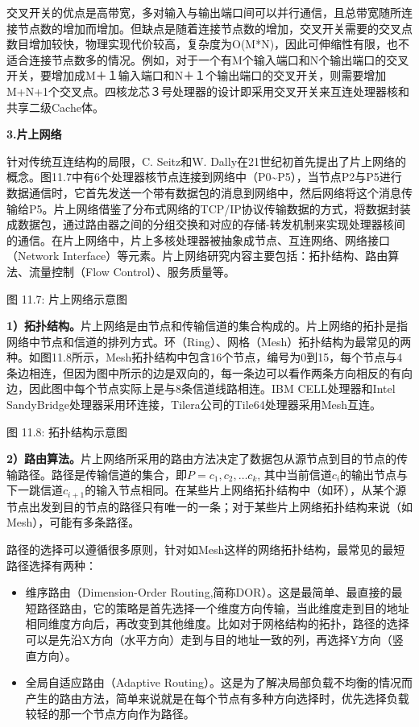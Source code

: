 \documentclass[]{ctexbook}
\begin{document}
交叉开关的优点是高带宽，多对输入与输出端口间可以并行通信，且总带宽随所连接节点数的增加而增加。但缺点是随着连接节点数的增加，交叉开关需要的交叉点数目增加较快，物理实现代价较高，复杂度为O(M*N)，因此可伸缩性有限，也不适合连接节点数多的情况。例如，对于一个有M个输入端口和N个输出端口的交叉开关，要增加成M＋１输入端口和N＋１个输出端口的交叉开关，则需要增加M+N+1个交叉点。四核龙芯３号处理器的设计即采用交叉开关来互连处理器核和共享二级Cache体。

\textbf{3.片上网络}

针对传统互连结构的局限，C. Seitz和W. Dally在21世纪初首先提出了片上网络的概念。图11.7中有6个处理器核节点连接到网络中（P0\textasciitilde P5），当节点P2与P5进行数据通信时，它首先发送一个带有数据包的消息到网络中，然后网络将这个消息传输给P5。片上网络借鉴了分布式网络的TCP/IP协议传输数据的方式，将数据封装成数据包，通过路由器之间的分组交换和对应的存储-转发机制来实现处理器核间的通信。在片上网络中，片上多核处理器被抽象成节点、互连网络、网络接口（Network Interface）等元素。片上网络研究内容主要包括：拓扑结构、路由算法、流量控制（Flow Control）、服务质量等。

图 11.7: 片上网络示意图

\textbf{1）拓扑结构。}片上网络是由节点和传输信道的集合构成的。片上网络的拓扑是指网络中节点和信道的排列方式。环（Ring）、网格（Mesh）拓扑结构为最常见的两种。如图11.8所示，Mesh拓扑结构中包含16个节点，编号为0到15，每个节点与4条边相连，但因为图中所示的边是双向的，每一条边可以看作两条方向相反的有向边，因此图中每个节点实际上是与8条信道线路相连。IBM CELL处理器和Intel SandyBridge处理器采用环连接，Tilera公司的Tile64处理器采用Mesh互连。

图 11.8: 拓扑结构示意图

\textbf{2）路由算法。}片上网络所采用的路由方法决定了数据包从源节点到目的节点的传输路径。路径是传输信道的集合，即\(P = {c_1,c_2,…c_k}\), 其中当前信道\(c_i\)的输出节点与下一跳信道\(c_{i+1}\)的输入节点相同。在某些片上网络拓扑结构中（如环），从某个源节点出发到目的节点的路径只有唯一的一条；对于某些片上网络拓扑结构来说（如Mesh），可能有多条路径。

路径的选择可以遵循很多原则，针对如Mesh这样的网络拓扑结构，最常见的最短路径选择有两种：

\begin{itemize}
\item
  维序路由（Dimension-Order Routing,简称DOR）。这是最简单、最直接的最短路径路由，它的策略是首先选择一个维度方向传输，当此维度走到目的地址相同维度方向后，再改变到其他维度。比如对于网格结构的拓扑，路径的选择可以是先沿X方向（水平方向）走到与目的地址一致的列，再选择Y方向（竖直方向）。
\item
  全局自适应路由（Adaptive Routing）。这是为了解决局部负载不均衡的情况而产生的路由方法，简单来说就是在每个节点有多种方向选择时，优先选择负载较轻的那一个节点方向作为路径。
\end{itemize}
\end{document}
